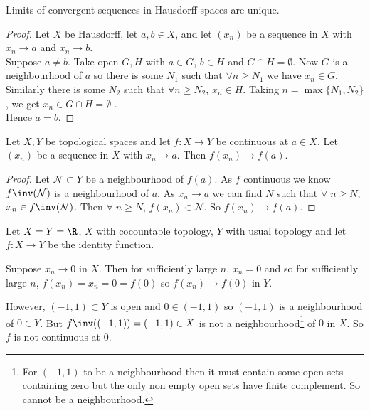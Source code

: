 \begin{proposition} \label{prp:29}
Limits of convergent sequences in Hausdorff spaces are unique.
\end{proposition}

\begin{proof}
Let $X$ be Hausdorff, let $a,b \in X$, and let $(x_n)$ be a sequence in $X$ with $x_n \to a$ and $x_n \to b$. \\
Suppose $a \neq b$.
Take open $G,H$ with $a \in G$, $b \in H$ and $G \cap H = \emptyset$.
Now $G$ is a neighbourhood of $a$ so there is some $N_1$ such that $\forall n \geq N_1$ we have $x_n \in G$.
Similarly there is some $N_2$ such that $\forall n \geq N_2$, $x_n\in H$.
Taking $n = \max\{N_1,N_2\}$, we get $x_n\in G\cap H = \emptyset$ \Lightning. \\
Hence $a = b$.
\end{proof}

\begin{proposition} \label{prp:30}
Let $X,Y$ be topological spaces and let $f:X \to Y$ be continuous at $a\in X$. Let $(x_n)$ be a sequence in $X$ with $x_n \to a$. Then $f(x_n) \to f(a)$.
\end{proposition}
\begin{proof}
Let $\mathcal{N} \subset Y$ be a neighbourhood of $f(a)$.
As $f$ continuous we know $f\inv (\mathcal{N})$ is a neighbourhood of $a$.
As $x_n \to a$ we can find $N$ such that $\forall \; n \geq N$, $x_n\in f\inv(\mathcal{N})$.
Then $\forall \; n \geq N$, $f(x_n) \in \mathcal{N}$. So $f(x_n) \to f(a)$.
\end{proof}

\begin{example}
Let $X=Y=\R$, $X$ with cocountable topology, $Y$ with usual topology and let $f:X \to Y$ be the identity function.

Suppose $x_n \to 0$ in $X$. Then for sufficiently large $n$, $x_n=0$ and so for sufficiently large $n$, $f(x_n) = x_n = 0 = f(0)$ so $f(x_n) \to f(0)$ in $Y$.

However, $(-1,1)\subset Y$ is open and $0\in (-1,1)$ so $(-1,1)$ is a neighbourhood of $0\in Y$. But $f\inv((-1,1)) = (-1,1)\in X$ is not a neighbourhood\footnote{For $(-1, 1)$ to be a neighbourhood then it must contain some open sets containing zero but the only non empty open sets have finite complement. So cannot be a neighbourhood.} of $0$ in $X$. So $f$ is not continuous at $0$.
\end{example}

